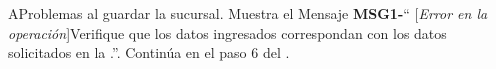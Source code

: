 

\begin{UCtrayectoriaA}{A}{Problemas al guardar la sucursal.}
			\UCpaso Muestra el Mensaje {\bf MSG1-}`` [{\em Error en la operación}]Verifique que los datos ingresados correspondan con los datos solicitados en la  .''.
			\UCpaso Continúa en el paso 6 del .
		\end{UCtrayectoriaA}

